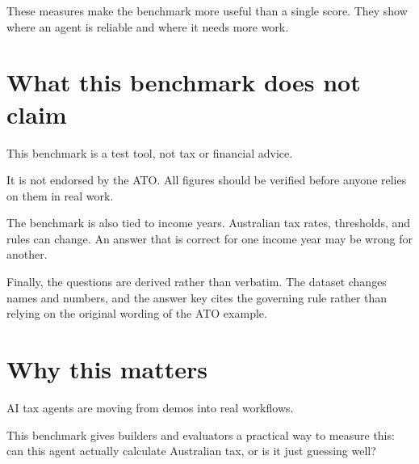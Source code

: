 \documentclass[11pt]{article}
\begin{document}
These measures make the benchmark more useful than a single score. They show where an agent is reliable and where it needs more work.

\section{What this benchmark does not claim}

This benchmark is a test tool, not tax or financial advice.

It is not endorsed by the ATO. All figures should be verified before anyone relies on them in real work.

The benchmark is also tied to income years. Australian tax rates, thresholds, and rules can change. An answer that is correct for one income year may be wrong for another.

Finally, the questions are derived rather than verbatim. The dataset changes names and numbers, and the answer key cites the governing rule rather than relying on the original wording of the ATO example.

\section{Why this matters}

AI tax agents are moving from demos into real workflows.

This benchmark gives builders and evaluators a practical way to measure this: can this agent actually calculate Australian tax, or is it just guessing well?
\end{document}
